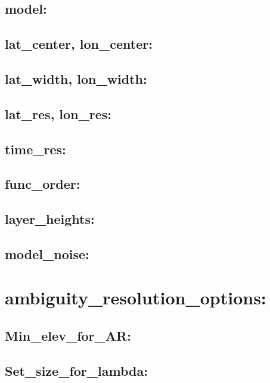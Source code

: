 \subsection{model:}

\subsection{lat\_center, lon\_center:}

\subsection{lat\_width, lon\_width:}

\subsection{lat\_res, lon\_res:}

\subsection{time\_res:}

\subsection{func\_order:}

\subsection{layer\_heights:}

\subsection{model\_noise:}





\section{ambiguity\_resolution\_options:}

\subsection{Min\_elev\_for\_AR:}

\subsection{Set\_size\_for\_lambda:}

